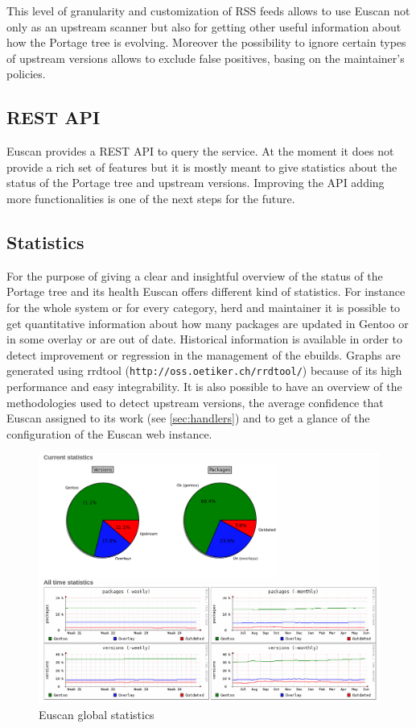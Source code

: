 This level of granularity and customization of RSS feeds allows to use Euscan not only as an upstream scanner but also for getting other useful information about how the Portage tree is evolving. Moreover the possibility to ignore certain types of upstream versions allows to exclude false positives, basing on the maintainer's policies.


\subsection{REST API}
Euscan provides a REST API to query the service. At the moment it does not provide a rich set of features but it is mostly meant to give statistics about the status of the Portage tree and upstream versions.
Improving the API adding more functionalities is one of the next steps for the future.


\subsection{Statistics}
For the purpose of giving a clear and insightful overview of the status of the Portage tree and its health Euscan offers different kind of statistics.
For instance for the whole system or for every category, herd and maintainer it is possible to get quantitative information about how many packages are updated in Gentoo or in some overlay or are out of date. Historical information is available in order to detect improvement or regression in the management of the ebuilds.
Graphs are generated using rrdtool (\texttt{http://oss.oetiker.ch/rrdtool/}) because of its high performance and easy integrability.
It is also possible to have an overview of the methodologies used to detect upstream versions, the average confidence that Euscan assigned to its work (see \ref{sec:handlers}) and to get a glance of the configuration of the Euscan web instance.

\begin{figure}[h!]
  \centering
    \includegraphics[width=13.5cm,natwidth=1030,natheight=754]{img/statistics.png}
  \caption{Euscan global statistics}
\end{figure}


